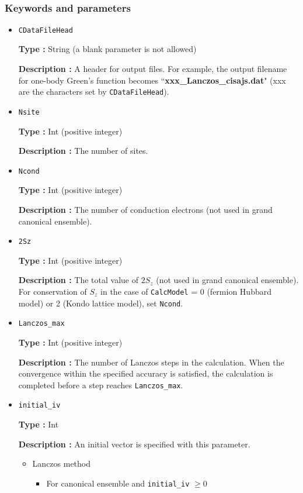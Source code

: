~\subsubsection{Keywords and parameters}
 \begin{itemize}
  \item  \verb|CDataFileHead|

 {\bf Type :} String (a blank parameter is not allowed)

{\bf Description :} A header for output files. For example, the output filename for one-body Green's function becomes ``{\bf xxx\_Lanczos\_cisajs.dat}" (xxx are the characters set by \verb|CDataFileHead|). 
   
 \item  \verb|Nsite|

{\bf Type :} Int (positive integer)

{\bf Description :} The number of sites.  


 \item  \verb|Ncond|

{\bf Type :} {Int (positive integer)}

{\bf Description :} {The number of conduction electrons (not used in grand canonical ensemble). }

 \item  \verb|2Sz|

{\bf Type :} {Int (positive integer)}

{\bf Description :} {The total value of $2S_z$ (not used in grand canonical ensemble). For conservation of $S_z$ in the case of } \verb|CalcModel| = 0 (fermion Hubbard model) or 2 (Kondo lattice model), set \verb|Ncond|.

 \item  \verb|Lanczos_max|

{\bf Type :} Int (positive integer)

{\bf Description :}  The number of Lanczos steps in the calculation. When the convergence within the specified accuracy is satisfied, the calculation is completed before a step reaches  \verb|Lanczos_max|.

 \item  \verb|initial_iv|

{\bf Type :} Int

{\bf Description :} 
{An initial vector is specified with this parameter.}
\begin{itemize}
\item{Lanczos method}
\begin{itemize}
\item{For canonical ensemble and \verb|initial_iv| $\geq 0$}


\end{itemize}
\end{itemize}
\end{itemize}
